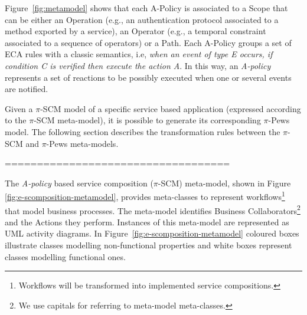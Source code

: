 Figure~\ref{fig:metamodel} shows that each {\sc A-Policy} is associated to a {\sc Scope} that can be either an {\sc Operation} (e.g., an authentication protocol associated to a method exported by a service),  an {\sc Operator} (e.g., a temporal constraint associated to a sequence of operators) or a {\sc Path}.  
Each {\sc A-Policy} groups a set of ECA rules with a classic semantics, i.e, {\em when an event of type E occurs, if condition C is verified then execute the action A}.  
In this way, an {\em A-policy} represents a set of reactions to be possibly executed when one or several events are notified.
%

Given a $\pi$-SCM model of a specific service based application (expressed according to the $\pi$-SCM meta-model), it is possible to generate its corresponding $\pi$-{\sc Pews} model. 
The following section describes the transformation rules between the $\pi$-SCM and $\pi$-{\sc Pews} meta-models.






===================================

The {\em A-policy} based service composition ($\pi$-SCM) meta-model, shown in Figure \ref{fig:e-scomposition-metamodel},
provides meta-classes to represent workflows\footnote{Workflows will be transformed into implemented service compositions.} that model  business processes.
The meta-model identifies {\sc Business Collaborators}\footnote{We use {\sc capitals} for referring to meta-model meta-classes.} and the {\sc Actions} they perform. 
Instances of this meta-model are represented as UML activity diagrams. 
In Figure~\ref{fig:e-scomposition-metamodel}  coloured boxes illustrate classes  modelling  non-functional properties and 
 white boxes represent classes modelling functional ones. 

